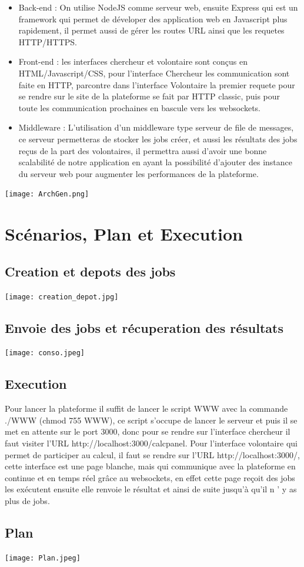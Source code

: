 \documentclass[a4paper]{article}
\begin{document}
\begin{itemize}
\item Back-end : On utilise NodeJS comme serveur web, ensuite Express qui est un framework qui permet de déveloper des application web en Javascript plus rapidement, il permet aussi de gérer les routes URL ainsi que les requetes HTTP/HTTPS.
\item Front-end : les interfaces chercheur et volontaire sont conçus en HTML/Javascript/CSS, pour l'interface Chercheur les communication sont faite en HTTP, parcontre dans l'interface Volontaire la premier requete pour se rendre sur le site de la plateforme se fait par HTTP classic, puis pour toute les communication prochaines en bascule vers les websockets.
\item Middleware : L'utilisation d'un middleware type serveur de file de messages, ce serveur permetteras de stocker les jobs créer, et aussi les résultats des jobs reçus de la part des volontaires, il permettra aussi d'avoir une bonne scalabilité de notre application en ayant la possibilité d'ajouter des instance du serveur web pour augmenter les performances de la plateforme.
\end{itemize} 

\begin{center}
\centering
\texttt{[image: ArchGen.png]}
\end{center}



\section{Scénarios, Plan et Execution}
\subsection{Creation et depots des jobs}
\begin{center}
\centering
\texttt{[image: creation\_depot.jpg]}
\end{center}

\subsection{Envoie des jobs et récuperation des résultats}
\begin{center}
\centering
\texttt{[image: conso.jpeg]}
\end{center}
\subsection{Execution}
Pour lancer la plateforme il suffit de lancer le script WWW avec la commande ./WWW (chmod 755 WWW), ce script s'occupe de lancer le serveur et puis il se met en attente sur le port 3000, donc pour se rendre sur l'interface chercheur il faut visiter l'URL http://localhost:3000/calcpanel.\newline{}
Pour l'interface volontaire qui permet de participer au calcul,  il faut se rendre sur l'URL http://localhost:3000/, cette interface est une page blanche, mais qui communique avec la plateforme en continue et en temps réel grâce au websockets, en effet cette page reçoit des jobs les exécutent ensuite elle renvoie le résultat et ainsi de suite jusqu'à qu'il n ' y as plus de jobs.
\subsection{Plan}
\begin{center}
\centering
\texttt{[image: Plan.jpeg]}
\end{center}
\end{document}
